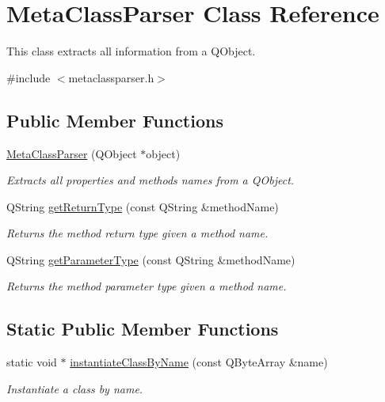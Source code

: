 \hypertarget{class_meta_class_parser}{}\section{Meta\+Class\+Parser Class Reference}
\label{class_meta_class_parser}


This class extracts all information from a Q\+Object.  




{\ttfamily \#include $<$metaclassparser.\+h$>$}

\subsection*{Public Member Functions}
\begin{DoxyCompactItemize}
\item 
\hyperlink{class_meta_class_parser_ae3df53e78d823b2edaa38fe6184c9e01}{Meta\+Class\+Parser} (Q\+Object $\ast$object)
\begin{DoxyCompactList}\small\item\em Extracts all properties and methods names from a Q\+Object. \end{DoxyCompactList}\item 
Q\+String \hyperlink{class_meta_class_parser_adf9eefe961550b4aaa9432532f5723f4}{get\+Return\+Type} (const Q\+String \&method\+Name)
\begin{DoxyCompactList}\small\item\em Returns the method return type given a method name. \end{DoxyCompactList}\item 
Q\+String \hyperlink{class_meta_class_parser_ada953748a39a39968054231128a08667}{get\+Parameter\+Type} (const Q\+String \&method\+Name)
\begin{DoxyCompactList}\small\item\em Returns the method parameter type given a method name. \end{DoxyCompactList}\end{DoxyCompactItemize}
\subsection*{Static Public Member Functions}
\begin{DoxyCompactItemize}
\item 
static void $\ast$ \hyperlink{class_meta_class_parser_a1441f0bf6e0db301ea726279d535c49b}{instantiate\+Class\+By\+Name} (const Q\+Byte\+Array \&name)
\begin{DoxyCompactList}\small\item\em Instantiate a class by name. \end{DoxyCompactList}\end{DoxyCompactItemize}
